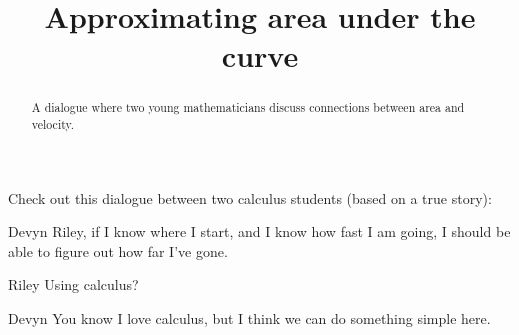 \documentclass{ximera}
\title[Break-Ground:]{Approximating area under the curve}
\begin{document}
\begin{abstract}
A dialogue where two young mathematicians discuss connections between
area and velocity.
\end{abstract}
\maketitle




Check out this dialogue between two calculus students (based on a true
story):

\begin{dialogue}
\item[Devyn] Riley, if I know where I start, and I know how fast I am
  going, I should be able to figure out how far I've gone.
\item[Riley] Using calculus?
\item[Devyn] You know I love calculus, but I think we can do
  something simple here.
\end{dialogue}




\end{document}
